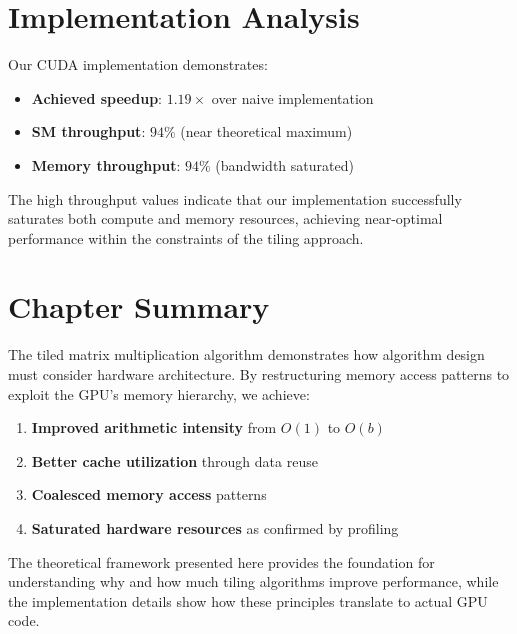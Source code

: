 \documentclass{amsbook}
\theoremstyle{definition}
\begin{document}
\section{Implementation Analysis}

Our CUDA implementation demonstrates:
\begin{itemize}
\item \textbf{Achieved speedup}: $1.19\times$ over naive implementation
\item \textbf{SM throughput}: $94\%$ (near theoretical maximum)
\item \textbf{Memory throughput}: $94\%$ (bandwidth saturated)
\end{itemize}

The high throughput values indicate that our implementation successfully saturates both compute and memory resources, achieving near-optimal performance within the constraints of the tiling approach.

\section{Chapter Summary}

The tiled matrix multiplication algorithm demonstrates how algorithm design must consider hardware architecture. By restructuring memory access patterns to exploit the GPU's memory hierarchy, we achieve:

\begin{enumerate}
\item \textbf{Improved arithmetic intensity} from $O(1)$ to $O(b)$
\item \textbf{Better cache utilization} through data reuse
\item \textbf{Coalesced memory access} patterns
\item \textbf{Saturated hardware resources} as confirmed by profiling
\end{enumerate}

The theoretical framework presented here provides the foundation for understanding why and how much tiling algorithms improve performance, while the implementation details show how these principles translate to actual GPU code.

\end{document}
